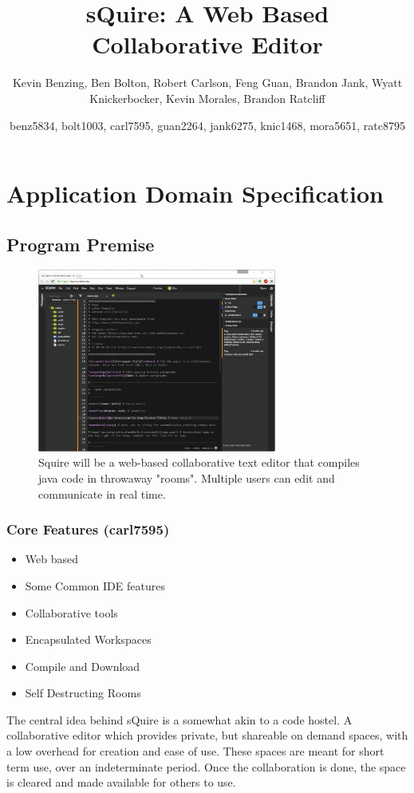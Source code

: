 \documentclass[11pt]{report}
\title{sQuire: A Web Based Collaborative Editor}
\author{Kevin Benzing, Ben Bolton, Robert Carlson, Feng Guan, Brandon Jank, Wyatt Knickerbocker, Kevin Morales, Brandon Ratcliff}
\author{benz5834, bolt1003, carl7595, guan2264, jank6275, knic1468, mora5651, ratc8795}
\begin{document}
\maketitle

\tableofcontents

\chapter{Application Domain Specification}

\section{Program Premise}
\begin{figure}[h!]
\caption{Squire will be a web-based collaborative text editor that compiles java code in throwaway "rooms". Multiple users can edit and communicate in real time.}
\includegraphics[width=0.7\textwidth]{squire}
\end{figure}

\subsection{Core Features (carl7595)}
\begin{itemize}
  \item Web based
  \item Some Common IDE features
  \item Collaborative tools
  \item Encapsulated Workspaces
  \item Compile and Download
  \item Self Destructing Rooms
\end{itemize}
The central idea behind sQuire is a somewhat akin to a code hostel. A collaborative editor which provides private, but shareable on demand spaces, with a low overhead for creation and ease of use. These spaces are meant for short term use, over an indeterminate period. Once the collaboration is done, the space is cleared and made available for others to use.
\end{document}
